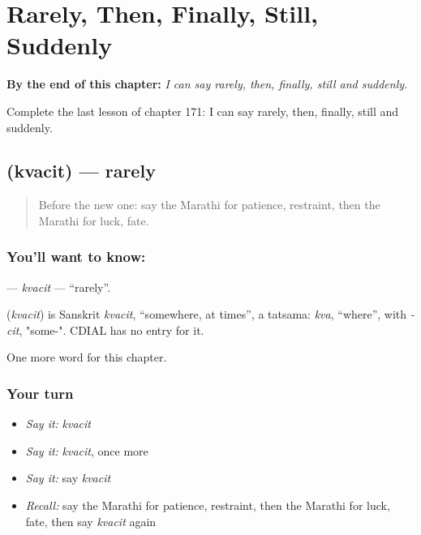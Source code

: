 
\chapter{Rarely, Then, Finally, Still, Suddenly}
\label{ch:mr-rarely-then-finally-still-suddenly}

\begin{chapteropening}
\textbf{By the end of this chapter:} \emph{I can say rarely, then, finally, still and suddenly.}

Complete the last lesson of chapter 171: I can say rarely, then, finally, still and suddenly.
\end{chapteropening}

\section[\texorpdfstring{\mr{क्वचित} (kvacit)}{क्वचित (kvacit)}]{ (kvacit) — rarely}

\label{lesson:MR-C171-kvacit}



\begin{quote}
Before the new one: say the Marathi for patience, restraint, then the Marathi for luck, fate.
\end{quote}

\subsection*{You'll want to know: }
\textbf{} — \emph{kvacit} — \textquotedblleft{}rarely\textquotedblright{}.

\begin{cousinweb}
\textbf{} (\emph{kvacit}) is Sanskrit \emph{kvacit}, \textquotedblleft{}somewhere, at times\textquotedblright{}, a tatsama: \emph{kva}, \textquotedblleft{}where\textquotedblright{}, with \emph{-cit}, "some-". CDIAL has no entry for it.
\end{cousinweb}

\begin{grammarlens}[title={What you've built}]
One more word for this chapter.
\end{grammarlens}

\subsection*{Your turn}
\begin{itemize}
\raggedright
  \item \emph{Say it:} \emph{kvacit}
  \item \emph{Say it:} \emph{kvacit}, once more
  \item \emph{Say it:} say \emph{kvacit}
  \item \emph{Recall:} say the Marathi for patience, restraint, then the Marathi for luck, fate, then say \emph{kvacit} again
\end{itemize}

